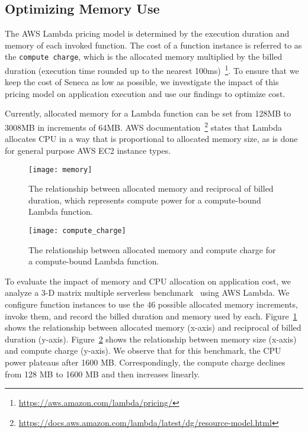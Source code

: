 \subsection{Optimizing Memory Use}

The AWS Lambda pricing model is determined by the execution duration 
and memory of each invoked function. The cost of a function instance is referred to as 
the \texttt{compute charge}, which is the allocated memory 
multiplied by the
billed duration (execution time rounded up to the 
nearest 100ms)~\footnote{\url{https://aws.amazon.com/lambda/pricing/}}.
To ensure that we keep the cost of Seneca as low as possible, we investigate
the impact of this pricing model on application execution and use
our findings to optimize cost.

Currently, allocated memory for a Lambda function can be set
from 128MB to 3008MB in increments of 64MB.
AWS documentation~\footnote{\url{https://docs.aws.amazon.com/lambda/latest/dg/resource-model.html}} 
states that Lambda 
allocates CPU in a way that is proportional to allocated memory size,
as is done for general purpose AWS EC2 instance types.

\begin{figure}[t] \centering 
\texttt{[image: memory]}
\caption{The relationship between allocated memory and reciprocal of billed duration, which represents compute power for a compute-bound Lambda function.
\label{fig:memory}}
\end{figure}

\begin{figure}[t] \centering 
\texttt{[image: compute\_charge]}
\caption{The relationship between allocated memory and compute charge for a compute-bound Lambda function.
\label{fig:compute_charge}}
\end{figure}


To evaluate the impact of memory and CPU allocation on application cost,
we analyze a 3-D matrix multiple serverless benchmark~\cite{ref:matrix} using AWS Lambda.
We configure function instances to use the 46 possible allocated 
memory increments, invoke them, and record the billed duration and memory used by each.
Figure~\ref{fig:memory} shows the relationship between allocated memory 
(x-axis) and reciprocal of billed duration (y-axis). 
Figure~\ref{fig:compute_charge} shows the relationship between memory 
size (x-axis) and compute charge (y-axis). 
We observe that for this benchmark,
the CPU power plateaus after 1600 MB. 
Correspondingly, the compute charge declines from 128 MB to 1600 MB 
and then increases linearly. 

